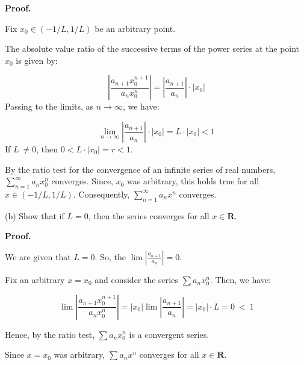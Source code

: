 \documentclass[10pt]{article}
\begin{document}
\textbf{Proof.}



Fix $\displaystyle x_{0} \in ( -1/L,1/L)$ be an arbitrary point. 



 The absolute value ratio of the successive terms of the power series at the point $\displaystyle x_{0}$ is given by:


\begin{equation*}
\left| \frac{a_{n+1} x_{0}^{n+1}}{a_{n} x_{0}^{n}}\right| =\left| \frac{a_{n+1}}{a_{n}}\right| \cdot |x_{0} |
\end{equation*}
Passing to the limits, as $\displaystyle n\rightarrow \infty $, we have:


\begin{equation*}
\lim _{n\rightarrow \infty }\left| \frac{a_{n+1}}{a_{n}}\right| \cdot |x_{0} |=L\cdot |x_{0} |< 1
\end{equation*}
If $\displaystyle L\ \neq 0$, then $\displaystyle 0< L\cdot |x_{0} |=r< 1$. 

By the ratio test for the convergence of an infinite series of real numbers, $\displaystyle \sum _{n=1}^{\infty } a_{n} x_{0}^{n}$ converges. Since, $\displaystyle x_{0}$ was arbitrary, this holds true for all $\displaystyle x\in ( -1/L,1/L)$. Consequently, $\displaystyle \sum _{n=1}^{\infty } a_{n} x^{n}$ converges.



(b) Show that if $\displaystyle L=0$, then the series converges for all $\displaystyle x\in \mathbf{R}$.



\textbf{Proof.}



We are given that $\displaystyle L=0$. So, the $\displaystyle \lim \left| \frac{a_{n+1}}{a_{n}}\right| =0$. 



Fix an arbitrary $\displaystyle x=x_{0}$ and consider the series $\displaystyle \sum a_{n} x_{0}^{n}$. Then, we have:


\begin{equation*}
\lim \left| \frac{a_{n+1} x_{0}^{n+1}}{a_{n} x_{0}^{n}}\right| =|x_{0} |\lim \left| \frac{a_{n+1}}{a_{n}}\right| =|x_{0} |\cdot L=0\ < \ 1
\end{equation*}


Hence, by the ratio test, $\displaystyle \sum a_{n} x_{0}^{n}$ is a convergent series.



Since $\displaystyle x=x_{0}$ was arbitrary, $\displaystyle \sum a_{n} x^{n}$ converges for all $\displaystyle x\in \mathbf{R}$.
\end{document}
